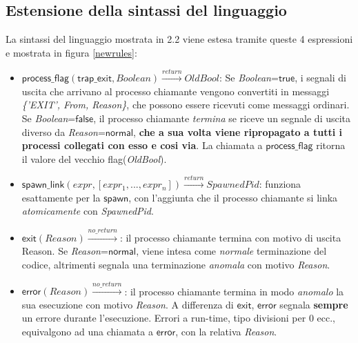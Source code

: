 \documentclass[Contributo.tex]{subfiles}
\begin{document}
\subsection{Estensione della sintassi del linguaggio}
La sintassi del linguaggio mostrata in 2.2 viene estesa tramite queste 4 espressioni e mostrata in figura \ref{newrules}:
\begin{itemize}
	\item $\displaystyle \mathsf{process\_flag}(\mathsf{trap\_exit},Boolean)\xrightarrow{return}OldBool$: Se \textit{Boolean}=$\mathsf{true}$, i segnali di uscita che arrivano al processo chiamante vengono convertiti in messaggi \textit{\{'EXIT', From, Reason\}}, che possono essere ricevuti come messaggi ordinari. 
	Se \textit{Boolean}=$\mathsf{false}$, il processo chiamante \textit{termina} se riceve un segnale di uscita diverso da \textit{Reason}=$\mathsf{normal}$, \textbf{che a sua volta viene ripropagato a tutti i processi collegati con esso e cosi via}.
	La chiamata a $\mathsf{process\_flag}$ ritorna il valore del vecchio flag(\textit{OldBool}).
	\item $\displaystyle \mathsf{spawn\_link}(expr, [expr_{1},...,expr_{n}])\xrightarrow{return}SpawnedPid$: funziona esattamente per la $\mathsf{spawn}$, con l'aggiunta che il processo chiamante si linka \textit{atomicamente} con \textit{SpawnedPid}.
	\item $\displaystyle \mathsf{exit}(Reason)\xrightarrow{no\_return}$: il processo chiamante termina con motivo di uscita Reason.
	Se \textit{Reason}=$\mathsf{normal}$, viene intesa come \textit{normale} terminazione del codice, altrimenti segnala una terminazione \textit{anomala} con motivo \textit{Reason}.
	\item $\displaystyle \mathsf{error}(Reason)\xrightarrow{no\_return}$: il processo chiamante termina in modo \textit{anomalo} la sua esecuzione con motivo \textit{Reason}.
	A differenza di $\mathsf{exit}$, $\mathsf{error}$ segnala \textbf{sempre} un errore durante l'esecuzione.
	Errori a run-time, tipo divisioni per 0 ecc., equivalgono ad una chiamata a $\mathsf{error}$, con la relativa \textit{Reason}.
\end{itemize}
\end{document}

